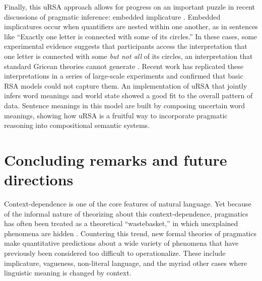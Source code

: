 \documentclass[]{elsarticle}
\begin{document}



Finally, this uRSA approach allows for progress on an important puzzle
in recent discussions of pragmatic inference: embedded implicature \citep{geurts2009,chemla2011}. Embedded
implicatures occur when quantifiers are nested within one another, as in
sentences like ``Exactly one letter is connected with some of its
circles.'' In these cases, some experimental evidence suggests that
participants access the interpretation that one letter is connected with
some \emph{but not all} of its circles, an interpretation that standard
Gricean theories cannot generate \citep{chemla2011}. 
Recent work \citep{potts2015} has replicated these interpretations in a series of large-scale
experiments and confirmed that basic RSA models could not capture them.
An implementation of uRSA that jointly infers word meanings and world state \citep{bergen2016,potts2015} showed a good fit to the overall pattern of data. Sentence meanings in this model are built by composing uncertain word meanings, showing how uRSA is a fruitful way to incorporate pragmatic reasoning into compositional semantic systems.

\section{Concluding remarks and future directions}\label{conclusions-and-future-directions}

Context-dependence is one of the core features of natural language. Yet
because of the informal nature of theorizing about this context-dependence,
pragmatics has often been treated as a theoretical ``wastebasket,'' in
which unexplained phenomena are hidden \citep{bar-hillel1971}. Countering this trend, new formal theories of pragmatics make quantitative
predictions about a wide variety of phenomena that have previously been
considered too difficult to operationalize. These include implicature,
vagueness, non-literal language, and the myriad other cases where
linguistic meaning is changed by context.
\end{document}
